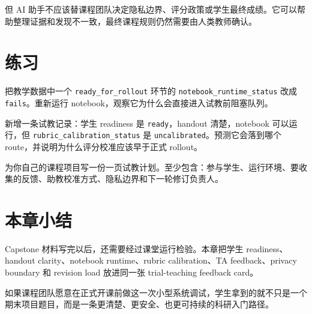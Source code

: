 但 AI 助手不应该替课程团队决定隐私边界、评分政策或学生最终成绩。它可以帮助整理证据和发现不一致，最终课程规则仍然需要由人类教师确认。

\section{练习}

\begin{exercisebox}[基础练习]
把教学数据中一个 \texttt{ready\_for\_rollout} 环节的 \texttt{notebook\_runtime\_status} 改成 \texttt{fails}。重新运行 notebook，观察它为什么会直接进入试教前阻塞队列。
\end{exercisebox}

\begin{exercisebox}[进阶练习]
新增一条试教记录：学生 readiness 是 \texttt{ready}，handout 清楚，notebook 可以运行，但 \texttt{rubric\_calibration\_status} 是 \texttt{uncalibrated}。预测它会落到哪个 route，并说明为什么评分校准应该早于正式 rollout。
\end{exercisebox}

\begin{exercisebox}[开放练习]
为你自己的课程项目写一份一页试教计划。至少包含：参与学生、运行环境、要收集的反馈、助教校准方式、隐私边界和下一轮修订负责人。
\end{exercisebox}

\section{本章小结}

Capstone 材料写完以后，还需要经过课堂运行检验。本章把学生 readiness、handout clarity、notebook runtime、rubric calibration、TA feedback、privacy boundary 和 revision load 放进同一张 trial-teaching feedback card。

如果课程团队愿意在正式开课前做这一次小型系统调试，学生拿到的就不只是一个期末项目题目，而是一条更清楚、更安全、也更可持续的科研入门路径。
